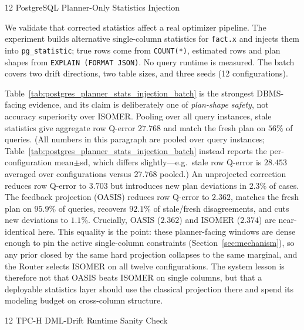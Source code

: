 \documentclass[preprint,12pt]{elsarticle}
\makeatletter
\newcommand{\oasisUseMaxWidthResize}[1]{%
  \renewcommand{\resizebox}[3]{\adjustbox{max width=#1}{##3}}%
}
\renewcommand\subsubsection{\@startsection{subsubsection}{3}{\z@}%
           {12\p@ \@plus 6\p@ \@minus 3\p@}%
           {\p@}%
           {\normalfont\normalsize\bfseries}}
\makeatother
\begin{document}
\subsubsection{PostgreSQL Planner-Only Statistics Injection}
\label{sec:postgres-planner}

We validate that corrected statistics affect a real optimizer pipeline. The experiment
builds alternative single-column statistics for \texttt{fact.x} and injects them into
\texttt{pg\_statistic}; true rows come from \texttt{COUNT(*)}, estimated rows and plan
shapes from \texttt{EXPLAIN (FORMAT JSON)}. No query runtime is measured. The batch
covers two drift directions, two table sizes, and three seeds (12 configurations).

\begingroup
\oasisUseMaxWidthResize{.88\columnwidth}

\endgroup

Table~\ref{tab:postgres_planner_stats_injection_batch} is the strongest DBMS-facing
evidence, and its claim is deliberately one of \emph{plan-shape safety}, not accuracy
superiority over ISOMER. Pooling over all query instances, stale statistics give
aggregate row Q-error $27.768$ and match the fresh plan on $56\%$ of queries.
(All numbers in this paragraph are pooled over query instances;
Table~\ref{tab:postgres_planner_stats_injection_batch} instead reports
the per-configuration mean$\pm$sd, which differs slightly---e.g.\ stale row Q-error is
$28.453$ averaged over configurations versus $27.768$ pooled.)
An unprojected correction reduces row Q-error to $3.703$ but introduces new plan deviations
in $2.3\%$ of cases. The feedback projection (OASIS) reduces row Q-error to $2.362$, matches the fresh plan on
$95.9\%$ of queries, recovers $92.1\%$ of stale/fresh disagreements, and cuts new
deviations to $1.1\%$. Crucially, OASIS ($2.362$) and ISOMER ($2.374$) are near-identical here.
This equality is the point: these planner-facing windows are dense enough to pin the active
single-column constraints (Section~\ref{sec:mechanism}), so any prior closed by the same hard
projection collapses to the same marginal, and the Router selects ISOMER on all twelve
configurations. The system lesson is therefore not that OASIS beats ISOMER on single columns,
but that a deployable statistics layer should use the classical projection there and spend
its modeling budget on cross-column structure.


\subsubsection{TPC-H DML-Drift Runtime Sanity Check}
\label{sec:tpch-runtime}
\end{document}
